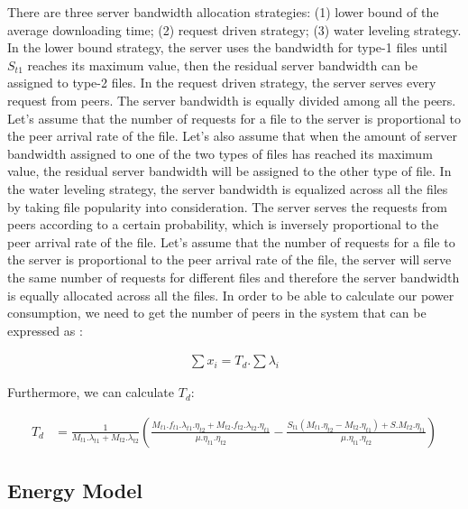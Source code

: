 There are three server bandwidth allocation strategies: (1) lower bound of the average downloading time; (2) request driven strategy; (3) water leveling strategy. 
In the lower bound strategy, the server uses the bandwidth for type-1 files until $S_{t1}$ reaches its maximum value, then the residual server bandwidth can be assigned to type-2 files. 
In the request driven strategy, the server serves every request from peers. 
The server bandwidth is equally divided among all the peers. 
Let’s assume that the number of requests for a file to the server is proportional to the peer arrival rate of the file. 
Let’s also assume that when the amount of server bandwidth assigned to one of the two types of files has reached its maximum value, the residual server bandwidth will be assigned to the other type of file. 
In the water leveling strategy, the server bandwidth is equalized across all the files by taking file popularity into consideration. 
The server serves the requests from peers according to a certain probability, which is inversely proportional to the peer arrival rate of the file.
Let’s assume that the number of requests for a file to the server is proportional to the peer arrival rate of the file, the server will serve the same number of requests for different files and therefore the server bandwidth is equally allocated across all the files.  
In order to be able to calculate our power consumption, we need to get the number of peers in the system that can be expressed as \cite{Sun:2009:POS:1542245.1542249}:

\begin{equation}\label{eqn:numofpeers}
\begin{split}
\sum x_i = T_d . \sum \lambda_i
\end{split}     
\end{equation} 

Furthermore, we can calculate $T_d$:

\begin{equation}\label{eqn:averagetimedownload}
\begin{split}
T_d &= \frac{1}{M_{t1}.\lambda_{t1} + M_{t2}.\lambda_{t2}}\left(\frac{M_{t1}.f_{t1}.\lambda_{t1}.\eta_{t2} + M_{t2}.f_{t2}.\lambda_{t2}.\eta_{t1}}{\mu.\eta_{t1}.\eta_{t2}} - \frac{S_{t1} (M_{t1}.\eta_{t2}-M_{t2}.\eta_{t1}) + S.M_{t2}.\eta_{t1}}{\mu.\eta_{t1}.\eta_{t2}}\right) 
\end{split}     
\end{equation} 

\subsection{Energy Model}\label{thermodynamics}

